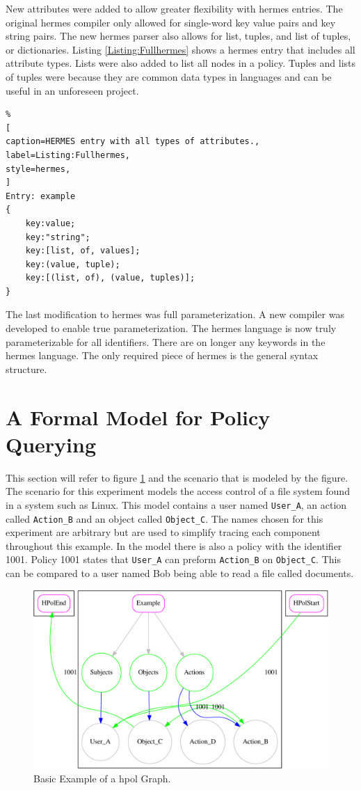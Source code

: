 \documentclass[12pt,letterpaper]{report}
\begin{document}
New attributes were added to allow greater flexibility with \ac{hermes} entries. The original \ac{hermes} compiler only allowed for single-word key value pairs and key string pairs. The new \ac{hermes} parser also allows for list, tuples, and list of tuples, or dictionaries. Listing \ref{Listing:Fullhermes} shows a \ac{hermes} entry that includes all attribute types. Lists were also added to list all nodes in a policy. Tuples and lists of tuples were because they are common data types in languages and can be useful in an unforeseen project.

\begin{lstlisting}%
[
caption=HERMES entry with all types of attributes.,
label=Listing:Fullhermes,
style=hermes,
]
Entry: example
{
	key:value;
	key:"string";
	key:[list, of, values];
	key:(value, tuple);
	key:[(list, of), (value, tuples)];
}
\end{lstlisting}

The last modification to \ac{hermes} was full parameterization. A new compiler was developed to enable true parameterization. The \ac{hermes} language is now truly parameterizable for all identifiers. There are on longer any keywords in the \ac{hermes} language. The only required piece of \ac{hermes} is the general syntax structure.

\section{A Formal Model for Policy Querying}
This section will refer to figure \ref{HPolExample} and the scenario that is modeled by the figure. The scenario for this experiment models the access control of a file system found in a system such as Linux. This model contains a user named \texttt{User\_A}, an action called \texttt{Action\_B} and an object called \texttt{Object\_C}. The names chosen for this experiment are arbitrary but are used to simplify tracing each component throughout this example. In the model there is also a policy with the identifier 1001. Policy 1001 states that \texttt{User\_A} can preform \texttt{Action\_B} on \texttt{Object\_C}. This can be compared to a user named Bob being able to read a file called documents. 


\begin{figure}
	\centering
	\includegraphics[width=\textwidth]{paper2Example.pdf}
	\caption{Basic Example of a \ac{hpol} Graph.}
	\label{HPolExample}
\end{figure}
\end{document}

